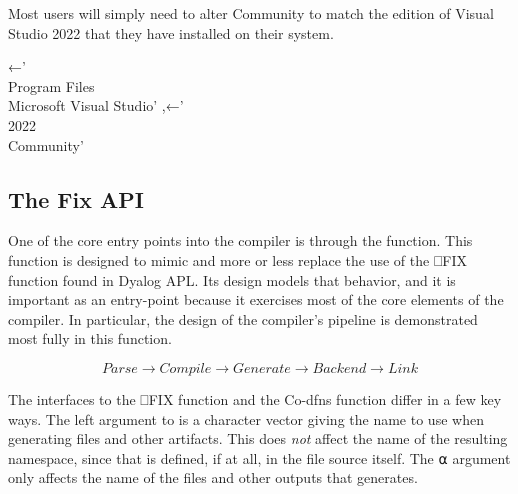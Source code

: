 \documentclass{article}%
\begin{document}
\noindent
Most users will simply need to alter {\Tt{}Community\nwendquote} to match the 
edition of Visual Studio 2022 that they have installed on their 
system.

\nwenddocs{}\plusendmoddef\nwstartdeflinemarkup{}\nwenddeflinemarkup
{}←'\\Program Files\\Microsoft Visual Studio'
,←'\\2022\\Community'
\eatline
{}\nwendcode{}\nwdocspar
\subsection{The Fix API}

One of the core entry points into the compiler is through the {\Tt{}\nwendquote}
function.
This function is designed to mimic and more or less replace the
use of the {\Tt{}⎕FIX\nwendquote} function found in Dyalog APL.
Its design models that behavior, and it is important as an entry-point
because it exercises most of the core elements of the compiler.
In particular, the design of the compiler's pipeline is demonstrated
most fully in this function.

$$Parse → Compile → Generate → Backend → Link$$

\noindent
The interfaces to the {\Tt{}⎕FIX\nwendquote} function and the Co-dfns {\Tt{}\nwendquote}
function differ in a few key ways.
The left argument to {\Tt{}\nwendquote} is a character vector giving the name
to use when generating files and other artifacts.
This does \emph{not} affect the name of the resulting namespace,
since that is defined, if at all, in the file source itself.
The {\Tt{}⍺\nwendquote} argument only affects the name of the files and other
outputs that {\Tt{}\nwendquote} generates.
\end{document}
